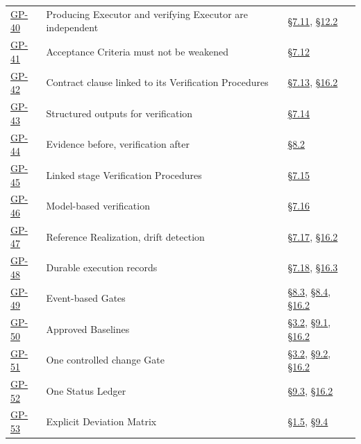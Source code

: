 \begin{longtable}{@{}p{} p{} p{}@{}}
\hyperlink{gp-40}{GP-40} & Producing Executor and verifying Executor are independent & \hyperlink{nss-7.11}{\S7.11}, \hyperlink{nss-12.2}{\S12.2} \\

\hyperlink{gp-41}{GP-41} & Acceptance Criteria must not be weakened & \hyperlink{nss-7.12}{\S7.12} \\

\hyperlink{gp-42}{GP-42} & Contract clause linked to its Verification Procedures & \hyperlink{nss-7.13}{\S7.13}, \hyperlink{nss-16.2}{\S16.2} \\

\hyperlink{gp-43}{GP-43} & Structured outputs for verification & \hyperlink{nss-7.14}{\S7.14} \\

\hyperlink{gp-44}{GP-44} & Evidence before, verification after & \hyperlink{nss-8.2}{\S8.2} \\

\hyperlink{gp-45}{GP-45} & Linked stage Verification Procedures & \hyperlink{nss-7.15}{\S7.15} \\

\hyperlink{gp-46}{GP-46} & Model-based verification & \hyperlink{nss-7.16}{\S7.16} \\

\hyperlink{gp-47}{GP-47} & Reference Realization, drift detection & \hyperlink{nss-7.17}{\S7.17}, \hyperlink{nss-16.2}{\S16.2} \\

\hyperlink{gp-48}{GP-48} & Durable execution records & \hyperlink{nss-7.18}{\S7.18}, \hyperlink{nss-16.3}{\S16.3} \\

\hyperlink{gp-49}{GP-49} & Event-based Gates & \hyperlink{nss-8.3}{\S8.3}, \hyperlink{nss-8.4}{\S8.4}, \hyperlink{nss-16.2}{\S16.2} \\

\hyperlink{gp-50}{GP-50} & Approved Baselines & \hyperlink{nss-3.2}{\S3.2}, \hyperlink{nss-9.1}{\S9.1}, \hyperlink{nss-16.2}{\S16.2} \\

\hyperlink{gp-51}{GP-51} & One controlled change Gate & \hyperlink{nss-3.2}{\S3.2}, \hyperlink{nss-9.2}{\S9.2}, \hyperlink{nss-16.2}{\S16.2} \\

\hyperlink{gp-52}{GP-52} & One Status Ledger & \hyperlink{nss-9.3}{\S9.3}, \hyperlink{nss-16.2}{\S16.2} \\

\hyperlink{gp-53}{GP-53} & Explicit Deviation Matrix & \hyperlink{nss-1.5}{\S1.5}, \hyperlink{nss-9.4}{\S9.4} \\


\end{longtable}
